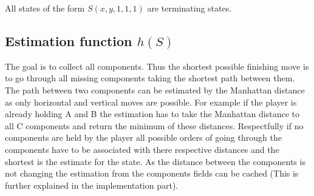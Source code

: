 \documentclass{article}
\begin{document}
All states of the form $S(x,y,1,1,1)$ are terminating states.

\subsection{Estimation function $h(S)$}
The goal is to collect all components. Thus the shortest possible finishing move is to go through all missing components taking the shortest path between them. The path between two components can be estimated by the Manhattan distance as only horizontal and vertical moves are possible. For example if the player is already holding A and B the estimation has to take the Manhattan distance to all C components and return the minimum of these distances. Respectfully if no components are held by the player all possible orders of going through the components have to be associated with there respective distances and the shortest is the estimate for the state. As the distance between the components is not changing the estimation from the components fields can be cached (This is further explained in the implementation part). %
\end{document}

